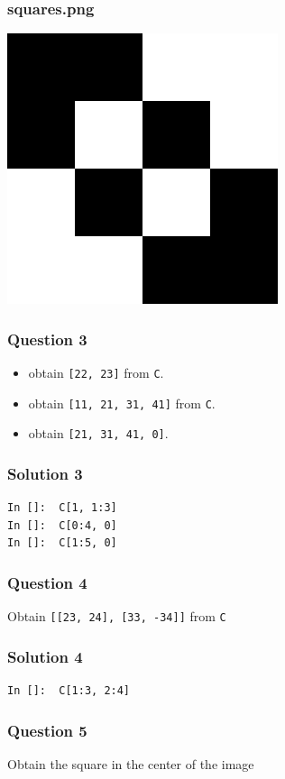 \documentclass[presentation]{beamer}
\begin{document}
\begin{frame}
\frametitle{squares.png}
\label{sec-7}

    \begin{center}
      \includegraphics[scale=0.6]{squares}    
    \end{center}
\end{frame}
\begin{frame}
\frametitle{Question 3}
\label{sec-8}

\begin{itemize}
\item obtain \texttt{[22, 23]} from \texttt{C}.
\item obtain \texttt{[11, 21, 31, 41]} from \texttt{C}.
\item obtain \texttt{[21, 31, 41, 0]}.
\end{itemize}
\end{frame}
\begin{frame}[fragile]
\frametitle{Solution 3}
\label{sec-9}

\begin{verbatim}
In []:  C[1, 1:3]
In []:  C[0:4, 0]
In []:  C[1:5, 0]
\end{verbatim}
\end{frame}
\begin{frame}
\frametitle{Question 4}
\label{sec-10}

  Obtain \texttt{[[23, 24], [33, -34]]} from \texttt{C}
\end{frame}
\begin{frame}[fragile]
\frametitle{Solution 4}
\label{sec-11}

\begin{verbatim}
In []:  C[1:3, 2:4]
\end{verbatim}
\end{frame}
\begin{frame}
\frametitle{Question 5}
\label{sec-12}

  Obtain the square in the center of the image
\end{frame}
\end{document}
